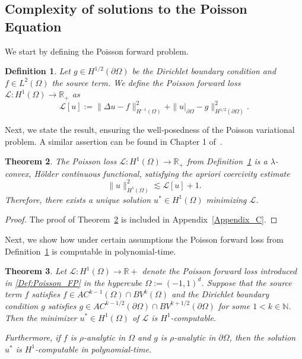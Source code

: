 \documentclass[pdflatex]{sn-jnl}%
\newtheorem{theorem}{Theorem}[section]%
\newtheorem{definition}[theorem]{Definition}
\begin{document}
\subsection{Complexity of solutions to the Poisson Equation}
We start by defining the Poisson forward problem.
\begin{definition}\label{Def:Poisson_FP}
    Let $g\in H^{1/2}(\partial\Omega)$ be the Dirichlet boundary condition and $f\in L^2(\Omega)$ the source term. We define the \emph{Poisson forward loss} $\mathcal{L}:H^1(\Omega)\rightarrow\mathbb{R}_+$ as 
    \begin{equation}
        \mathcal{L}[u]:= \|\Delta u-f\|_{H^{-1}(\Omega)}^2+\|u|_{\partial\Omega}-g\|_{H^{1/2}(\partial\Omega)}^2.
    \end{equation}
\end{definition}
Next, we state the result, ensuring the well-posedness of the Poisson variational problem. A similar assertion can be found in Chapter 1 of~\cite{Bochev2009-ut}.
\begin{theorem}\label{thm:prop_poiss_loss}
    The Poisson loss $\mathcal{L}:H^1(\Omega)\rightarrow\mathbb{R}_+$ from Definition~\ref{Def:Poisson_FP} is a $\lambda$-convex, H\"older continuous functional,
    satisfying the apriori coercivity estimate 
    \begin{equation}\label{eq:apr_est}
        \|u\|_{H^1(\Omega)}^2\lesssim \mathcal{L}[u]+1.
    \end{equation}
    Therefore, there exists a unique solution $u^*\in H^1(\Omega)$ minimizing $\mathcal{L}$.
\end{theorem}
\vspace{-1em}\begin{proof}
    The proof of Theorem~\ref{thm:prop_poiss_loss} is included in Appendix~\ref{Appendix_C}.
\end{proof}
Next, we show how under certain assumptions the Poisson forward loss from Definition~\ref{Def:Poisson_FP} is computable in polynomial-time.
\begin{theorem}\label{thm:comp_poisson}
Let $\mathcal{L}: H^1(\Omega) \to \mathbb{R}+$ denote the Poisson forward loss introduced in \eqref{Def:Poisson_FP} in the hypercube $\Omega:=(-1,1)^d$. Suppose that the source term $f$ satisfies $f \in AC^{k-1}(\Omega) \cap BV^{k}(\Omega)$ and the Dirichlet boundary condition $g$ satisfies $g \in AC^{k-1/2}(\partial\Omega) \cap BV^{k+1/2}(\partial\Omega)$ for some $1<k \in \mathbb{N}$. Then the minimizer $u^* \in H^1(\Omega)$ of $\mathcal{L}$ is $H^1$-computable. 

Furthermore, if $f$ is $\rho$-analytic in $\Omega$ and $g$ is $\rho$-analytic in $\partial\Omega$, then the solution $u^*$ is $H^1$-computable in polynomial-time.
\end{theorem}
\end{document}
